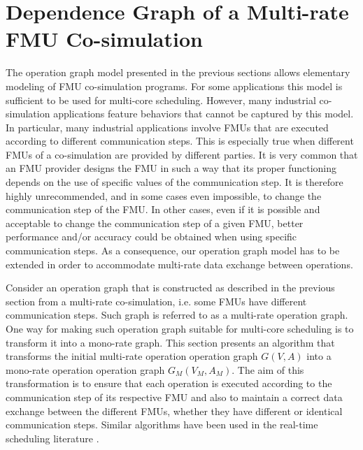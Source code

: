 \section{Dependence Graph of a Multi-rate FMU Co-simulation}

The operation graph model presented in the previous sections allows elementary modeling of FMU co-simulation programs. For some applications this model is sufficient to be used for multi-core scheduling. However, many industrial co-simulation applications feature behaviors that cannot be captured by this model. In particular, many industrial applications involve FMUs that are executed according to different communication steps. This is especially true when different FMUs of a co-simulation are provided by different parties. It is very common that an FMU provider designs the FMU in such a way that its proper functioning depends on the use of specific values of the communication step. It is therefore highly unrecommended, and in some cases even impossible, to change the communication step of the FMU. In other cases, even if it is possible and acceptable to change the communication step of a given FMU, better performance and/or accuracy could be obtained when using specific communication steps. As a consequence, our operation graph model has to be extended in order to accommodate multi-rate data exchange between operations. 

Consider an operation graph that is constructed as described in the previous section from a multi-rate co-simulation, i.e. some FMUs have different communication steps. Such graph is referred to as a multi-rate operation graph. One way for making such operation graph suitable for multi-core scheduling is to transform it into a mono-rate graph. This section presents an algorithm that transforms the initial multi-rate operation operation graph $G(V,A)$ into a mono-rate operation operation graph $G_M(V_M,A_M)$. The aim of this transformation is to ensure that each operation is executed according to the communication step of its respective FMU and also to maintain a correct data exchange between the different FMUs, whether they have different or identical communication steps. Similar algorithms have been used in the real-time scheduling literature \cite{kermia:2009, ramamritham:1995}.

